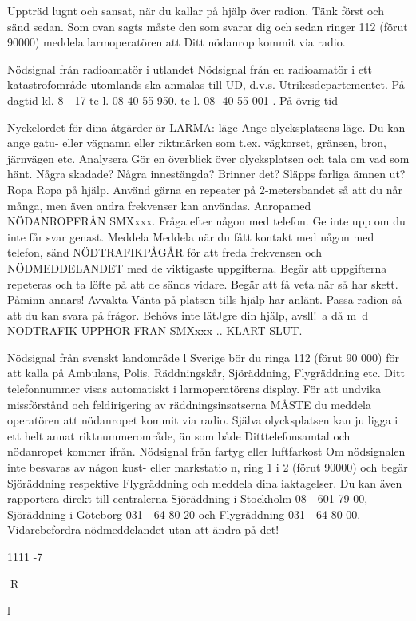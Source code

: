 Uppträd lugnt och sansat, när du kallar på
hjälp över radion. Tänk först och sänd sedan. Som ovan sagts måste den som svarar
dig och sedan ringer 112 (förut 90000) meddela larmoperatören att Ditt nödanrop kommit via radio.

Nödsignal från radioamatör i utlandet
Nödsignal från en radioamatör i ett katastrofområde utomlands ska anmälas till UD, d.v.s.
Utrikesdepartementet.
På dagtid kl. 8 - 17
te l. 08-40 55 950.
te l. 08- 40 55 001 .
På övrig tid

Nyckelordet för dina åtgärder är LARMA:
läge
Ange olycksplatsens läge. Du kan
ange gatu- eller vägnamn eller
riktmärken som t.ex. vägkorset,
gränsen, bron, järnvägen etc.
Analysera Gör en överblick över olycksplatsen och tala om vad som hänt.
Några skadade? Några innestängda? Brinner det? Släpps
farliga ämnen ut?
Ropa
Ropa på hjälp. Använd gärna en
repeater på 2-metersbandet så
att du når många, men även andra frekvenser kan användas.
Anropamed NÖDANROPFRÅN
SMXxxx. Fråga efter någon med
telefon. Ge inte upp om du inte får
svar genast.
Meddela Meddela när du fått kontakt med
någon med telefon, sänd NÖDTRAFIKPÅGÅR för att freda frekvensen och NÖDMEDDELANDET med de viktigaste uppgifterna. Begär att uppgifterna repeteras och ta löfte på att de sänds
vidare. Begär att få veta när så
har skett. Påminn annars!
Avvakta Vänta på platsen tills hjälp har
anlänt. Passa radion så att du
kan svara på frågor. Behövs inte
lätJgre din hjälp, avsll!~a då m~d
NODTRAFIK UPPHOR FRAN
SMXxxx .. KLART SLUT.

Nödsignal från svenskt landområde
l Sverige bör du ringa 112 (förut 90 000) för
att kalla på Ambulans, Polis, Räddningskår,
Sjöräddning, Flygräddning etc. Ditt telefonnummer visas automatiskt i larmoperatörens display.
För att undvika missförstånd och feldirigering av räddningsinsatserna MÅSTE
du meddela operatören att nödanropet kommit via radio. Själva olycksplatsen kan ju
ligga i ett helt annat riktnummerområde, än
som både Ditttelefonsamtal och nödanropet
kommer ifrån.
Nödsignal från fartyg eller luftfarkost
Om nödsignalen inte besvaras av någon
kust- eller markstatio n, ring 1 i 2 (förut 90000)
och begär Sjöräddning respektive Flygräddning och meddela dina iaktagelser. Du
kan även rapportera direkt till centralerna
Sjöräddning i Stockholm 08 - 601 79 00,
Sjöräddning i Göteborg 031 - 64 80 20 och
Flygräddning 031 - 64 80 00.
Vidarebefordra nödmeddelandet utan att
ändra på det!

1111 -7

R

l

